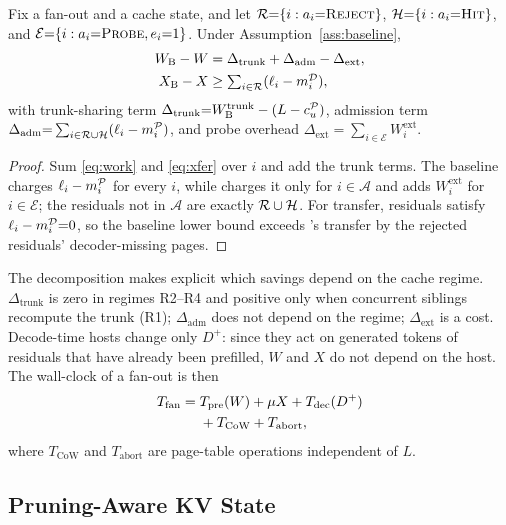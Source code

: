 \begin{proposition}[Accounting]
\label{prop:acct}
Fix a fan-out and a cache state, and let $\mathcal{R}{=}\{i:a_i{=}\textsc{Reject}\}$, $\mathcal{H}{=}\{i:a_i{=}\textsc{Hit}\}$, and $\mathcal{E}{=}\{i:a_i{=}\textsc{Probe},e_i{=}1\}$.
Under Assumption~\ref{ass:baseline},
\begin{align}
W_{\mathrm{B}}-W &= \Delta_{\mathrm{trunk}}+\Delta_{\mathrm{adm}}-\Delta_{\mathrm{ext}}, \label{eq:acct}\\
X_{\mathrm{B}}-X &\ge \textstyle\sum_{i\in\mathcal{R}}(\ell_i-m_i^{\mathcal{D}}), \nonumber
\end{align}
with trunk-sharing term $\Delta_{\mathrm{trunk}}{=}W_{\mathrm{B}}^{\mathrm{trunk}}-(L-c_u^{\mathcal{P}})$, admission term $\Delta_{\mathrm{adm}}{=}\sum_{i\in\mathcal{R}\cup\mathcal{H}}(\ell_i-m_i^{\mathcal{P}})$, and probe overhead $\Delta_{\mathrm{ext}}{=}\sum_{i\in\mathcal{E}}W_i^{\mathrm{ext}}$.
\end{proposition}

\begin{proof}
Sum \eqref{eq:work} and \eqref{eq:xfer} over $i$ and add the trunk terms.
The baseline charges $\ell_i-m_i^{\mathcal{P}}$ for every $i$, while \sys charges it only for $i\in\mathcal{A}$ and adds $W_i^{\mathrm{ext}}$ for $i\in\mathcal{E}$; the residuals not in $\mathcal{A}$ are exactly $\mathcal{R}\cup\mathcal{H}$.
For transfer, \Hit residuals satisfy $\ell_i-m_i^{\mathcal{D}}{=}0$, so the baseline lower bound exceeds \sys's transfer by the rejected residuals' decoder-missing pages.
\end{proof}

The decomposition makes explicit which savings depend on the cache regime.
$\Delta_{\mathrm{trunk}}$ is zero in regimes R2--R4 and positive only when concurrent siblings recompute the trunk (R1); $\Delta_{\mathrm{adm}}$ does not depend on the regime; $\Delta_{\mathrm{ext}}$ is a cost.
Decode-time hosts change only $D^{+}$: since they act on generated tokens of residuals that have already been prefilled, $W$ and $X$ do not depend on the host.
The wall-clock of a fan-out is then
\begin{equation}
\label{eq:tfan}
\begin{aligned}
T_{\mathrm{fan}}={}&T_{\mathrm{pre}}(W)+\mu X+T_{\mathrm{dec}}(D^{+})\\
&+T_{\mathrm{CoW}}+T_{\mathrm{abort}},
\end{aligned}
\end{equation}
where $T_{\mathrm{CoW}}$ and $T_{\mathrm{abort}}$ are page-table operations independent of $L$.

\subsection{Pruning-Aware KV State}
\label{sec:kvstate}

